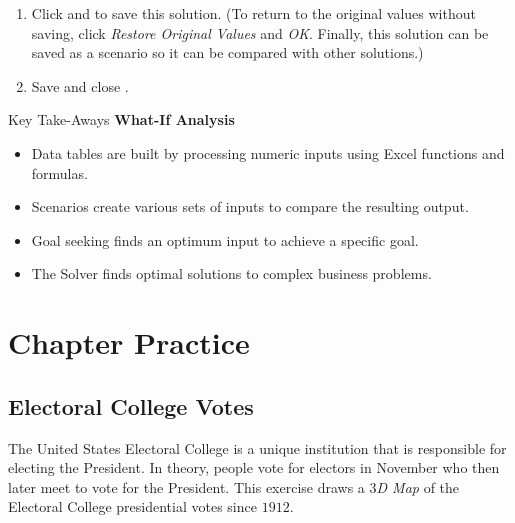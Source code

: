 \begin{enumerate}[resume]
	\item Click  and  to save this solution. (To return to the original values without saving, click \textit{Restore Original Values} and \textit{OK}. Finally, this solution can be saved as a scenario so it can be compared with other solutions.)
	\item Save and close .
\end{enumerate}

\begin{center}
	\begin{tkwbox}{Key Take-Aways}
		\textbf{What-If Analysis}
		\\
		\begin{itemize}
			\setlength{\itemsep}{0pt}
			\setlength{\parskip}{0pt}
			\setlength{\parsep}{0pt}
			
			\item Data tables are built by processing numeric inputs using Excel functions and formulas.
			\item Scenarios create various sets of inputs to compare the resulting output.
			\item Goal seeking finds an optimum input to achieve a specific goal.
			\item The Solver finds optimal solutions to complex business problems.
			
		\end{itemize}
	\end{tkwbox}
\end{center}

\section{Chapter Practice}

\subsection{Electoral College Votes}

The United States Electoral College is a unique institution that is responsible for electing the President. In theory, people vote for electors in November who then later meet to vote for the President. This exercise draws a \textit{$ 3 $D Map} of the Electoral College presidential votes since $ 1912 $.

